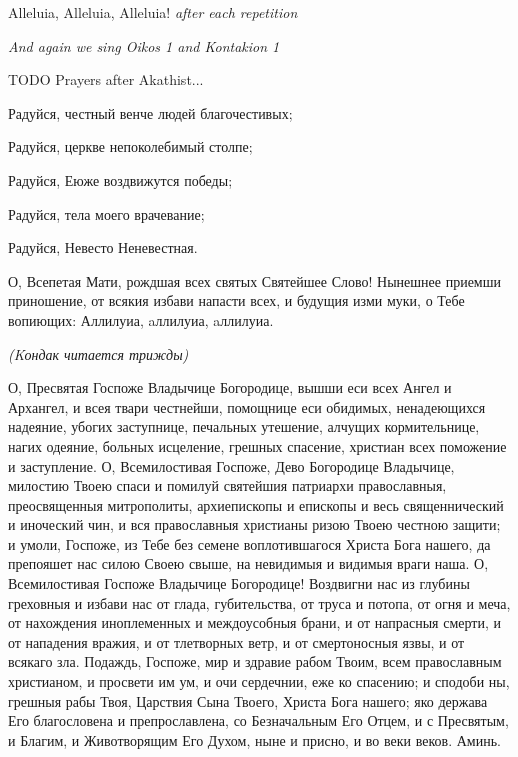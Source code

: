 \People Alleluia, Alleluia, Alleluia! \emph{after each repetition}

\begin{center}
  {\color{Maroon}\emph{And again we sing Oikos 1 and Kontakion 1 }}
\end{center}

TODO Prayers after Akathist...

\pagebreak

Радуйся, честный венче людей благочестивых;


Радуйся, церкве непоколебимый столпе;


Радуйся, Еюже воздвижутся победы;


Радуйся, тела моего врачевание;


Радуйся, Невесто Неневестная.


О, Всепетая Мати, рождшая всех святых Святейшее Слово! Нынешнее приемши приношение, от всякия избави напасти всех, и будущия изми муки, о Тебе вопиющих: Аллилуиа, aллилуиа, aллилуиа.

\begin{center}
  {\color{Maroon}\emph{(Kондак читается трижды)}}
\end{center}

\Ierei О, Пресвятая Госпоже Владычице Богородице, вышши еси всех Ангел и Архангел, и всея твари честнейши, помощнице еси обидимых, ненадеющихся надеяние, убогих заступнице, печальных утешение, алчущих кормительнице, нагих одеяние, больных исцеление, грешных спасение, христиан всех поможение и заступление. О, Всемилостивая Госпоже, Дево Богородице Владычице, милостию Твоею спаси и помилуй святейшия патриархи православныя, преосвященныя митрополиты, архиепископы и епископы и весь священнический и иноческий чин, и вся православныя христианы ризою Твоею честною защити; и умоли, Госпоже, из Тебе без семене воплотившагося Христа Бога нашего, да препояшет нас силою Своею свыше, на невидимыя и видимыя враги наша. О, Всемилостивая Госпоже Владычице Богородице! Воздвигни нас из глубины греховныя и избави нас от глада, губительства, от труса и потопа, от огня и меча, от нахождения иноплеменных и междоусобныя брани, и от напрасныя смерти, и от нападения вражия, и от тлетворных ветр, и от смертоносныя язвы, и от всякаго зла. Подаждь, Госпоже, мир и здравие рабом Твоим, всем православным христианом, и просвети им ум, и очи сердечнии, еже ко спасению; и сподоби ны, грешныя рабы Твоя, Царствия Сына Твоего, Христа Бога нашего; яко держава Его благословена и препрославлена, со Безначальным Его Отцем, и с Пресвятым, и Благим, и Животворящим Его Духом, ныне и присно, и во веки веков. Аминь.

